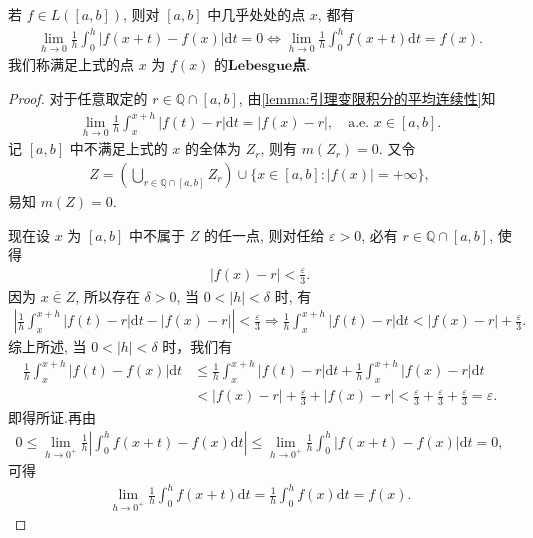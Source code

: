 \documentclass[../../main.tex]{subfiles}%
\begin{document}
\begin{corollary}\label{corollary:可积函数的Lebesgue点}
若 $f\in L([a,b])$, 则对 $[a,b]$ 中几乎处处的点 $x$, 都有
\begin{align*}
\lim_{h\rightarrow 0} \frac{1}{h}\int_0^h{\left| f\left( x+t \right) -f\left( x \right) \right|\mathrm{d}t}=0 \iff \lim_{h\rightarrow 0} \frac{1}{h}\int_0^h{f\left( x+t \right) \mathrm{d}t}=f\left( x \right) .
\end{align*}
我们称满足上式的点 $x$ 为 $f(x)$ 的$\mathbf{Lebesgue}$\textbf{点}.
\end{corollary}
\begin{proof}
对于任意取定的 $r\in\mathbb{Q}\cap[a,b]$, 由\cref{lemma:引理变限积分的平均连续性}知
\begin{align*}
\lim_{h\to 0} \frac{1}{h}\int_x^{x+h} |f(t)-r|\mathrm{d}t = |f(x)-r|, \quad \text{a.e. } x\in[a,b].
\end{align*}
记 $[a,b]$ 中不满足上式的 $x$ 的全体为 $Z_r$, 则有 $m(Z_r)=0$. 又令
\begin{align*}
Z = \left(\bigcup_{r\in\mathbb{Q}\cap[a,b]} Z_r\right) \cup \{x\in[a,b]: |f(x)|=+\infty\},
\end{align*}
易知 $m(Z)=0$.

现在设 $x$ 为 $[a,b]$ 中不属于 $Z$ 的任一点, 则对任给 $\varepsilon>0$, 必有 $r\in\mathbb{Q}\cap[a,b]$, 使得
\begin{align*}
|f(x)-r|<\frac{\varepsilon}{3}.
\end{align*}
因为 $x\overline{\in}Z$, 所以存在 $\delta>0$, 当 $0<|h|<\delta$ 时, 有
\begin{align*}
\left|\frac{1}{h}\int_x^{x+h} |f(t)-r|\mathrm{d}t - |f(x)-r|\right| < \frac{\varepsilon}{3}\Longrightarrow \frac{1}{h}\int_x^{x+h}{\left| f\left( t \right) -r \right|\mathrm{d}t}<\left| f\left( x \right) -r \right|+\frac{\varepsilon}{3}.
\end{align*}
综上所述, 当 $0<|h|<\delta$ 时，我们有
\begin{align*}
\frac{1}{h}\int_x^{x+h}{\left| f\left( t \right) -f\left( x \right) \right|\mathrm{d}t}&\leqslant \frac{1}{h}\int_x^{x+h}{\left| f\left( t \right) -r \right|\mathrm{d}t}+\frac{1}{h}\int_x^{x+h}{\left| f\left( x \right) -r \right|\mathrm{d}t}
\\
&<\left| f\left( x \right) -r \right|+\frac{\varepsilon}{3}+\left| f\left( x \right) -r \right|<\frac{\varepsilon}{3}+\frac{\varepsilon}{3}+\frac{\varepsilon}{3}=\varepsilon .
\end{align*}
即得所证.再由
\begin{align*}
0\leqslant \lim\limits_{h\rightarrow 0^+} \frac{1}{h}\left| \int_0^h{f\left( x+t \right) -f\left( x \right) \mathrm{d}t} \right|\leqslant \lim\limits_{h\rightarrow 0^+} \frac{1}{h}\int_0^h{\left| f\left( x+t \right) -f\left( x \right) \right|\mathrm{d}t}=0,
\end{align*}
可得
\begin{align*}
\lim_{h\rightarrow 0^+} \frac{1}{h}\int_0^h{f\left( x+t \right) \mathrm{d}t}=\frac{1}{h}\int_0^h{f\left( x \right) \mathrm{d}t}=f\left( x \right) .
\end{align*}
\end{proof}
\end{document}

